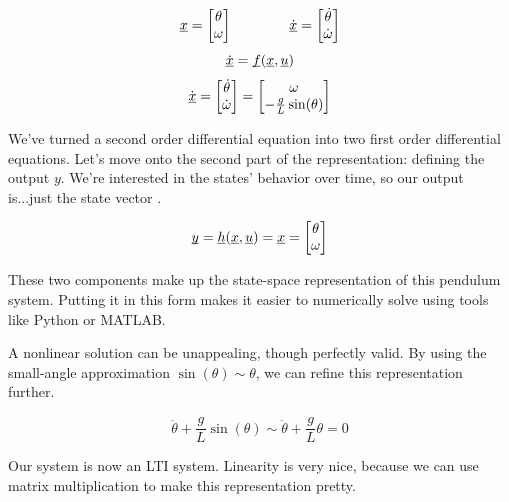 \documentclass{report}
\begin{document}
\begin{onehalfspacing}
\begin{flushleft}
\vspace{-0.1in}
\[\underbar{\(x\)} = \begin{bmatrix}
    \theta \\
    \omega  \end{bmatrix} \qquad \qquad \underbar{\(\dot{x}\)} = \begin{bmatrix}
        \dot{\theta} \\
        \dot{\omega}  \end{bmatrix}\]
\[\underbar{\(\dot{x}\)} = \underbar{\(f\)} (\underbar{\(x\)}, \underbar{\(u\)})\]
\vspace{-0.1in}
\[\dot{\underbar{\(x\)}} = \begin{bmatrix}
    \dot{\theta} \\
    \dot{\omega}  \end{bmatrix} = \begin{bmatrix}
    \omega \\
    -\frac{g}{L} \sin(\theta) 
\end{bmatrix}\]

We've turned a second order differential equation into two first order differential equations. Let's move onto the second part of the representation: defining the output \(y\). We're interested in the states' behavior over time, so our output is...just the state vector .

\[\underbar{\(y\)} = \underbar{\(h\)}(\underbar{\(x\)}, \underbar{\(u\)}) = \underbar{\(x\)} = \begin{bmatrix}
    \theta \\
    \omega  \end{bmatrix}\]

These two components make up the state-space representation of this pendulum system. Putting it in this form makes it easier to numerically solve using tools like Python or MATLAB.

\medskip

A nonlinear solution can be unappealing, though perfectly valid. By using the small-angle approximation \(\sin(\theta) \sim \theta\), we can refine this representation further.

\[\ddot{\theta} + \frac{g}{L} \sin(\theta) \sim \ddot{\theta} + \frac{g}{L} \theta = 0\]

Our system is now an LTI system. Linearity is very nice, because we can use matrix multiplication to make this representation pretty.


\end{flushleft}
\end{onehalfspacing}
\end{document}
